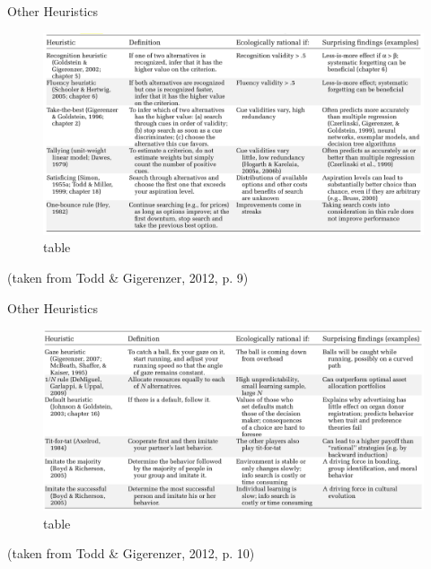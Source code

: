\documentclass[
  ignorenonframetext,
]{beamer}
\begin{document}
\begin{frame}{Other Heuristics}
\protect\hypertarget{other-heuristics}{}
\begin{figure}

{\centering \includegraphics{resources/images/heuristics_table1.png}

}

\caption{table}

\end{figure}

(taken from Todd \& Gigerenzer, 2012, p. 9)
\end{frame}

\begin{frame}{Other Heuristics}
\protect\hypertarget{other-heuristics-1}{}
\begin{figure}

{\centering \includegraphics{resources/images/heuristics_table2.png}

}

\caption{table}

\end{figure}

(taken from Todd \& Gigerenzer, 2012, p. 10)
\end{frame}
\end{document}
